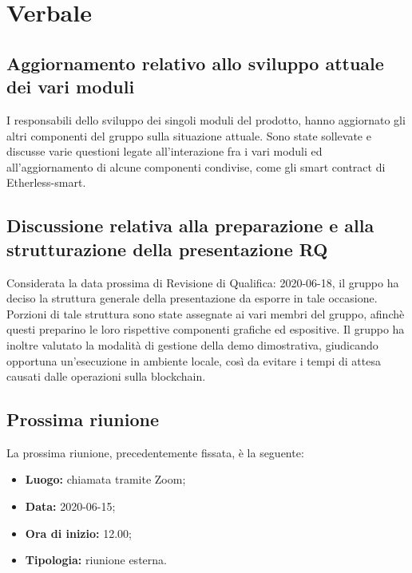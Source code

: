 \section{Verbale}
\subsection{Aggiornamento relativo allo sviluppo attuale dei vari moduli}
I responsabili dello sviluppo dei singoli moduli del prodotto, hanno aggiornato gli altri componenti del gruppo sulla situazione attuale. Sono state sollevate e discusse varie questioni legate all'interazione fra i vari moduli ed all'aggiornamento di alcune componenti condivise, come gli smart contract di Etherless-smart.
\subsection{Discussione relativa alla preparazione e alla strutturazione della presentazione RQ}
Considerata la data prossima di Revisione di Qualifica: 2020-06-18, il gruppo ha deciso la struttura generale della presentazione da esporre in tale occasione. Porzioni di tale struttura sono state assegnate ai vari membri del gruppo, afinchè questi preparino le loro rispettive componenti grafiche ed espositive. Il gruppo ha inoltre valutato la modalità di gestione della demo dimostrativa, giudicando opportuna un'esecuzione in ambiente locale, così da evitare i tempi di attesa causati dalle operazioni sulla blockchain.
\subsection{Prossima riunione}
	La prossima riunione, precedentemente fissata, è la seguente:
	\begin{itemize}
		\item \textbf{Luogo:} chiamata tramite Zoom;
		\item \textbf{Data:} 2020-06-15;
		\item \textbf{Ora di inizio:} 12.00;
		\item \textbf{Tipologia:} riunione esterna.
	\end{itemize}
